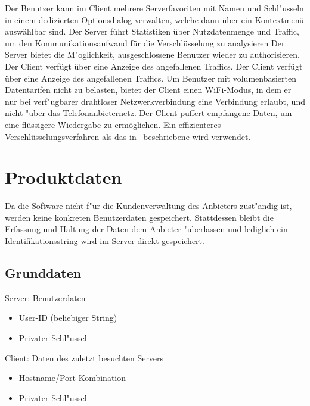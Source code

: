 \documentclass[a4paper,10pt]{scrartcl}
\begin{document}
\begin{usecase}
 {Der Benutzer kann im Client mehrere Serverfavoriten
                  mit Namen und Schl"usseln in einem dedizierten Optionsdialog verwalten,
                  welche dann über ein Kontextmenü auswählbar sind.}
 {Der Server führt Statistiken über Nutzdatenmenge und Traffic,
                  um den Kommunikationsaufwand für die Verschlüsselung zu
                  analysieren}
 {Der Server bietet die M"oglichkeit, ausgeschlossene Benutzer wieder
                  zu authorisieren.}
 {Der Client verfügt über eine Anzeige des angefallenen Traffics.}
 {Der Client verfügt über eine Anzeige des angefallenen Traffics.}
 {Um Benutzer mit volumenbasierten Datentarifen nicht zu belasten,
                  bietet der Client einen WiFi-Modus, in dem er nur bei
                  verf"ugbarer drahtloser Netzwerkverbindung eine Verbindung erlaubt,
                  und nicht "uber das Telefonanbieternetz.}
 {Der Client puffert empfangene Daten, um eine flüssigere
                  Wiedergabe zu ermöglichen.}
 {Ein effizienteres Verschlüsselungsverfahren als das in~\cite{Naor00} beschriebene
                  wird verwendet.}
\end{usecase}

\section{Produktdaten}
Da die Software nicht f"ur die Kundenverwaltung des Anbieters zust"andig ist, werden keine
konkreten Benutzerdaten gespeichert. Stattdessen bleibt die Erfassung und Haltung der Daten
dem Anbieter "uberlassen und lediglich ein Identifikationsstring wird im Server direkt gespeichert.

\subsection{Grunddaten}
\begin{usecase}
 {Server: Benutzerdaten
   \begin{itemize}
   \item User-ID (beliebiger String)
   \item Privater Schl"ussel
   \end{itemize}
}
 {Client: Daten des zuletzt besuchten Servers
   \begin{itemize}
   \item Hostname/Port-Kombination
   \item Privater Schl"ussel
   \end{itemize}
}
\end{usecase}
\end{document}
